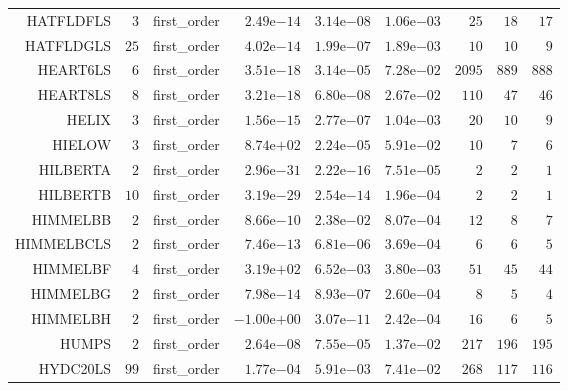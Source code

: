 \begin{longtable}{rrrrrrrrr}
HATFLDFLS & \(     3\) & first\_order & \( 2.49\)e\(-14\) & \( 3.14\)e\(-08\) & \( 1.06\)e\(-03\) & \(    25\) & \(    18\) & \(    17\) \\
HATFLDGLS & \(    25\) & first\_order & \( 4.02\)e\(-14\) & \( 1.99\)e\(-07\) & \( 1.89\)e\(-03\) & \(    10\) & \(    10\) & \(     9\) \\
HEART6LS & \(     6\) & first\_order & \( 3.51\)e\(-18\) & \( 3.14\)e\(-05\) & \( 7.28\)e\(-02\) & \(  2095\) & \(   889\) & \(   888\) \\
HEART8LS & \(     8\) & first\_order & \( 3.21\)e\(-18\) & \( 6.80\)e\(-08\) & \( 2.67\)e\(-02\) & \(   110\) & \(    47\) & \(    46\) \\
HELIX & \(     3\) & first\_order & \( 1.56\)e\(-15\) & \( 2.77\)e\(-07\) & \( 1.04\)e\(-03\) & \(    20\) & \(    10\) & \(     9\) \\
HIELOW & \(     3\) & first\_order & \( 8.74\)e\(+02\) & \( 2.24\)e\(-05\) & \( 5.91\)e\(-02\) & \(    10\) & \(     7\) & \(     6\) \\
HILBERTA & \(     2\) & first\_order & \( 2.96\)e\(-31\) & \( 2.22\)e\(-16\) & \( 7.51\)e\(-05\) & \(     2\) & \(     2\) & \(     1\) \\
HILBERTB & \(    10\) & first\_order & \( 3.19\)e\(-29\) & \( 2.54\)e\(-14\) & \( 1.96\)e\(-04\) & \(     2\) & \(     2\) & \(     1\) \\
HIMMELBB & \(     2\) & first\_order & \( 8.66\)e\(-10\) & \( 2.38\)e\(-02\) & \( 8.07\)e\(-04\) & \(    12\) & \(     8\) & \(     7\) \\
HIMMELBCLS & \(     2\) & first\_order & \( 7.46\)e\(-13\) & \( 6.81\)e\(-06\) & \( 3.69\)e\(-04\) & \(     6\) & \(     6\) & \(     5\) \\
HIMMELBF & \(     4\) & first\_order & \( 3.19\)e\(+02\) & \( 6.52\)e\(-03\) & \( 3.80\)e\(-03\) & \(    51\) & \(    45\) & \(    44\) \\
HIMMELBG & \(     2\) & first\_order & \( 7.98\)e\(-14\) & \( 8.93\)e\(-07\) & \( 2.60\)e\(-04\) & \(     8\) & \(     5\) & \(     4\) \\
HIMMELBH & \(     2\) & first\_order & \(-1.00\)e\(+00\) & \( 3.07\)e\(-11\) & \( 2.42\)e\(-04\) & \(    16\) & \(     6\) & \(     5\) \\
HUMPS & \(     2\) & first\_order & \( 2.64\)e\(-08\) & \( 7.55\)e\(-05\) & \( 1.37\)e\(-02\) & \(   217\) & \(   196\) & \(   195\) \\
HYDC20LS & \(    99\) & first\_order & \( 1.77\)e\(-04\) & \( 5.91\)e\(-03\) & \( 7.41\)e\(-02\) & \(   268\) & \(   117\) & \(   116\) \\

\end{longtable}
